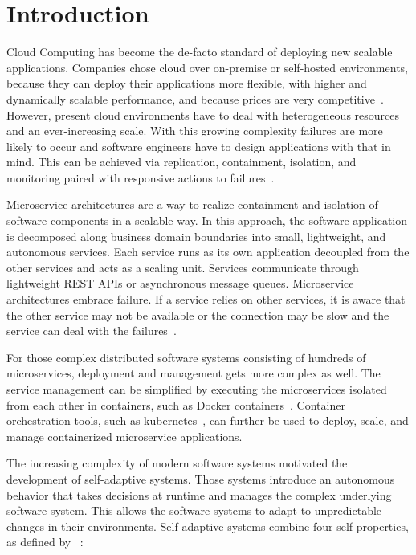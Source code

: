 
\section{Introduction}\label{sec:introduction}
  Cloud Computing has become the de-facto standard of deploying new scalable applications.
  Companies chose cloud over on-premise or self-hosted environments, because they can deploy their applications more flexible, with higher and dynamically scalable performance, and because prices are very competitive~\cite{ToffettiMicroservices}.
  However, present cloud environments have to deal with heterogeneous resources and an ever-increasing scale.
  With this growing complexity failures are more likely to occur and software engineers have to design applications with that in mind.
  This can be achieved via replication, containment, isolation, and monitoring paired with responsive actions to failures~\cite{reactivemanifesto}.

  Microservice architectures are a way to realize containment and isolation of software components in a scalable way.
  In this approach, the software application is decomposed along business domain boundaries into small, lightweight, and autonomous services.
  Each service runs as its own application decoupled from the other services and acts as a scaling unit.
  Services communicate through lightweight REST APIs or asynchronous message queues.
  Microservice architectures embrace failure.
  If a service relies on other services, it is aware that the other service may not be available or the connection may be slow and the service can deal with the failures~\cite{microservices}.

  For those complex distributed software systems consisting of hundreds of microservices, deployment and management gets more complex as well.
  The service management can be simplified by executing the microservices isolated from each other in containers, such as Docker containers~\cite{docker}.
  Container orchestration tools, such as \gls{kubernetes}~\cite{kubernetes}, can further be used to deploy, scale, and manage containerized microservice applications.

  The increasing complexity of modern software systems motivated the development of self-adaptive systems.
  Those systems introduce an autonomous behavior that takes decisions at runtime and manages the complex underlying software system.
  This allows the software systems to adapt to unpredictable changes in their environments.
  Self-adaptive systems combine four self properties, as defined by \citeauthor{Ganek}~\cite{Ganek}:

